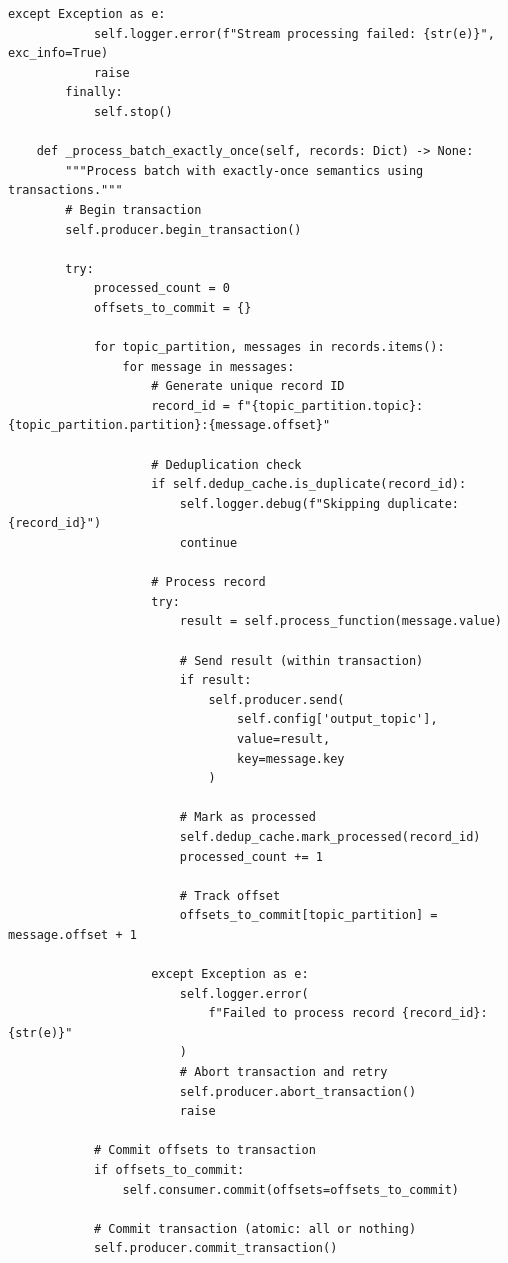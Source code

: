 \begin{lstlisting}[style=python, caption=StreamProcessor with Exactly-Once Guarantees]
        except Exception as e:
            self.logger.error(f"Stream processing failed: {str(e)}", exc_info=True)
            raise
        finally:
            self.stop()

    def _process_batch_exactly_once(self, records: Dict) -> None:
        """Process batch with exactly-once semantics using transactions."""
        # Begin transaction
        self.producer.begin_transaction()

        try:
            processed_count = 0
            offsets_to_commit = {}

            for topic_partition, messages in records.items():
                for message in messages:
                    # Generate unique record ID
                    record_id = f"{topic_partition.topic}:{topic_partition.partition}:{message.offset}"

                    # Deduplication check
                    if self.dedup_cache.is_duplicate(record_id):
                        self.logger.debug(f"Skipping duplicate: {record_id}")
                        continue

                    # Process record
                    try:
                        result = self.process_function(message.value)

                        # Send result (within transaction)
                        if result:
                            self.producer.send(
                                self.config['output_topic'],
                                value=result,
                                key=message.key
                            )

                        # Mark as processed
                        self.dedup_cache.mark_processed(record_id)
                        processed_count += 1

                        # Track offset
                        offsets_to_commit[topic_partition] = message.offset + 1

                    except Exception as e:
                        self.logger.error(
                            f"Failed to process record {record_id}: {str(e)}"
                        )
                        # Abort transaction and retry
                        self.producer.abort_transaction()
                        raise

            # Commit offsets to transaction
            if offsets_to_commit:
                self.consumer.commit(offsets=offsets_to_commit)

            # Commit transaction (atomic: all or nothing)
            self.producer.commit_transaction()


\end{lstlisting}
